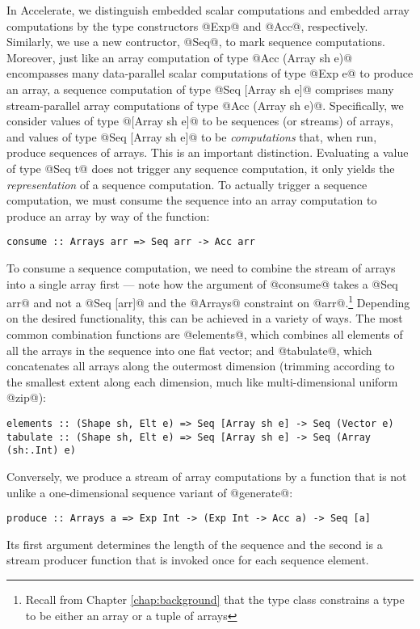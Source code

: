 In Accelerate, we distinguish embedded scalar computations and embedded array computations by the type constructors @Exp@ and @Acc@, respectively. Similarly, we use a new contructor, @Seq@, to mark sequence computations. Moreover, just like an array computation of type @Acc (Array sh e)@ encompasses many data-parallel scalar computations of type @Exp e@ to produce an array, a sequence computation of type @Seq [Array sh e]@ comprises many stream-parallel array computations of type @Acc (Array sh e)@. Specifically, we consider values of type @[Array sh e]@ to be sequences (or streams) of arrays, and values of type @Seq [Array sh e]@ to be \emph{computations} that, when run, produce sequences of arrays. This is an important distinction. Evaluating a value of type @Seq t@ does not trigger any sequence computation, it only yields the \emph{representation} of a sequence computation. To actually trigger a sequence computation, we must consume the sequence into an array computation to produce an array by way of the function:
%
\begin{lstlisting}
consume :: Arrays arr => Seq arr -> Acc arr
\end{lstlisting}

To consume a sequence computation, we need to combine the stream of arrays into a single array first --- note how the argument of @consume@ takes a @Seq arr@ and not a @Seq [arr]@ and the @Arrays@ constraint on @arr@.\footnote{Recall from Chapter \ref{chap:background} that the type class  constrains a type to be either an array or a tuple of arrays} Depending on the desired functionality, this can be achieved in a variety of ways. The most common combination functions are @elements@, which combines all elements of all the arrays in the sequence into one flat vector; and @tabulate@, which concatenates all arrays along the outermost dimension (trimming according to the smallest extent along each dimension, much like multi-dimensional uniform @zip@):
%
\begin{lstlisting}
elements :: (Shape sh, Elt e) => Seq [Array sh e] -> Seq (Vector e)
tabulate :: (Shape sh, Elt e) => Seq [Array sh e] -> Seq (Array (sh:.Int) e)
\end{lstlisting}

Conversely, we produce a stream of array computations by a function that is not unlike a one-dimensional sequence variant of @generate@:
%
\begin{lstlisting}
produce :: Arrays a => Exp Int -> (Exp Int -> Acc a) -> Seq [a]
\end{lstlisting}
%
Its first argument determines the length of the sequence and the second is a stream producer function that is invoked once for each sequence element.

